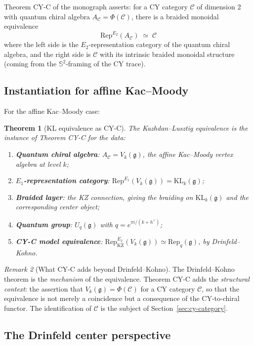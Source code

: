 \documentclass[11pt]{article}
\newtheorem{theorem}{Theorem}[section]
\theoremstyle{definition}
\theoremstyle{remark}
\newtheorem{remark}[theorem]{Remark}
\newcommand{\Rep}{\mathrm{Rep}}
\newcommand{\Uq}{U_q}
\newcommand{\cC}{\mathcal{C}}
\newcommand{\frakg}{\mathfrak{g}}
\newcommand{\KL}{\mathrm{KL}}
\newcommand{\KZ}{\mathrm{KZ}}
\newcommand{\hv}{h^\vee}
\begin{document}
Theorem CY-C of the monograph asserts: for a CY category $\cC$ of
dimension 2 with quantum chiral algebra $A_\cC = \Phi(\cC)$, there is
a braided monoidal equivalence
\[
 \Rep^{E_2}(A_\cC) \;\simeq\; \cC
\]
where the left side is the $E_2$-representation category of the
quantum chiral algebra, and the right side is $\cC$ with its intrinsic
braided monoidal structure (coming from the $\mathbb{S}^2$-framing of
the CY trace).

\subsection{Instantiation for affine Kac--Moody}
\label{subsec:cy-c-km}

For the affine Kac--Moody case:

\begin{theorem}[KL equivalence as CY-C]
\label{thm:kl-as-cy-c}
The Kazhdan--Lusztig equivalence is the instance of Theorem CY-C for
the data:
\begin{enumerate}[label=(\roman*)]
 \item \textbf{Quantum chiral algebra}: $A_\cC = V_k(\frakg)$, the affine
 Kac--Moody vertex algebra at level $k$;
 \item \textbf{$E_1$-representation category}:
 $\Rep^{E_1}(V_k(\frakg)) = \KL_k(\frakg)$;
 \item \textbf{Braided layer}: the KZ connection, giving the
 braiding on $\KL_k(\frakg)$ and the corresponding center object;
 \item \textbf{Quantum group}: $\Uq(\frakg)$ with $q = e^{\pi i/(k+\hv)}$;
 \item \textbf{CY-C model equivalence}:
 $\Rep^{E_2}_{\KZ}(V_k(\frakg)) \simeq \Rep_q(\frakg)$, by Drinfeld--Kohno.
\end{enumerate}
\end{theorem}

\begin{remark}[What CY-C adds beyond Drinfeld--Kohno]
The Drinfeld--Kohno theorem is the \emph{mechanism} of the equivalence.
Theorem CY-C adds the \emph{structural context}: the assertion that
$V_k(\frakg) = \Phi(\cC)$ for a CY category $\cC$, so that the
equivalence is not merely a coincidence but a consequence of the
CY-to-chiral functor. The identification of $\cC$ is the subject of
Section~\ref{sec:cy-category}.
\end{remark}

\subsection{The Drinfeld center perspective}
\label{subsec:drinfeld-center}
\end{document}
